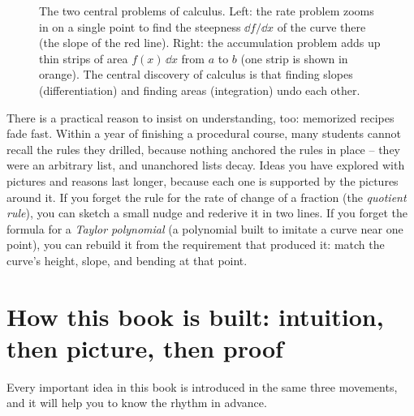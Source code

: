 \begin{figure}[htbp]
\caption{The two central problems of calculus. Left: the rate problem zooms in on a single point to find the steepness $\dd f/\dd x$ of the curve there (the slope of the red line). Right: the accumulation problem adds up thin strips of area $f(x)\,\dd x$ from $a$ to $b$ (one strip is shown in orange). The central discovery of calculus is that finding slopes (differentiation) and finding areas (integration) undo each other.}
\label{ch00:two-problems}
\end{figure}

There is a practical reason to insist on understanding, too: memorized recipes fade fast. Within a year of finishing a procedural
course, many students cannot recall the rules they drilled, because nothing
anchored the rules in place -- they were an arbitrary list, and unanchored lists decay. Ideas
you have explored with pictures and reasons last longer, because each one is supported
by the pictures around it. If you forget the rule for the rate of change of a fraction (the
\emph{quotient rule}), you can sketch a small nudge and rederive it in two lines. If you forget the
formula for a \emph{Taylor polynomial} (a polynomial built to imitate a curve near one point), you
can rebuild it from the requirement that produced it: match the curve's height, slope, and bending
at that point.

\section*{How this book is built: intuition, then picture, then proof}

Every important idea in this book is introduced in the same three movements, and it will help you to
know the rhythm in advance.

